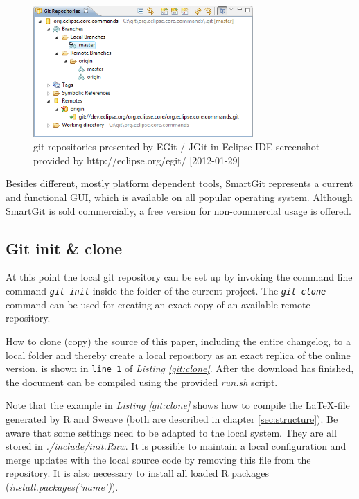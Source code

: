 \documentclass{ifacconf}
\begin{document}
\begin{figure}[h]
\begin{center}
\includegraphics[width=8.4cm]{pics/EGit.png}    %
\caption{git repositories presented by EGit / JGit in Eclipse IDE \newline 
screenshot provided by http://eclipse.org/egit/ [2012-01-29]} 
\label{fig:JGit}
\end{center}
\end{figure}

Besides different, mostly platform dependent tools, 
SmartGit represents a current and functional GUI, which
is available on all popular operating system. Although SmartGit is sold commercially,
a free version for non-commercial usage is offered.




\subsection{Git init \& clone}
At this point the local git repository can be set up by invoking the
command line command \textit{\lstinline!git init!} inside
the folder of the current project. The \textit{\lstinline!git clone!} 
command can be used for creating an exact copy of an available remote repository.

How to clone (copy) the source of this paper, including the entire changelog, to a local folder 
and thereby create a local repository as an exact replica of the online version,
is shown in \verb|line 1| of \textit{Listing \ref{git:clone}}. After the download has
finished, the document can be compiled using the provided \textit{run.sh} script. 

Note that the example in \textit{Listing \ref{git:clone}} shows how to compile 
the \LaTeX-file generated by R and Sweave (both are described in chapter \ref{sec:structure}).
Be aware that some settings need to be adapted to the local system. They are all stored
in \textit{./include/init.Rnw}. It is possible to maintain a local configuration and 
merge updates with the local source code by removing this file from the repository.
It is also necessary to install all loaded R packages (\textit{install.packages('name')}).
\end{document}
